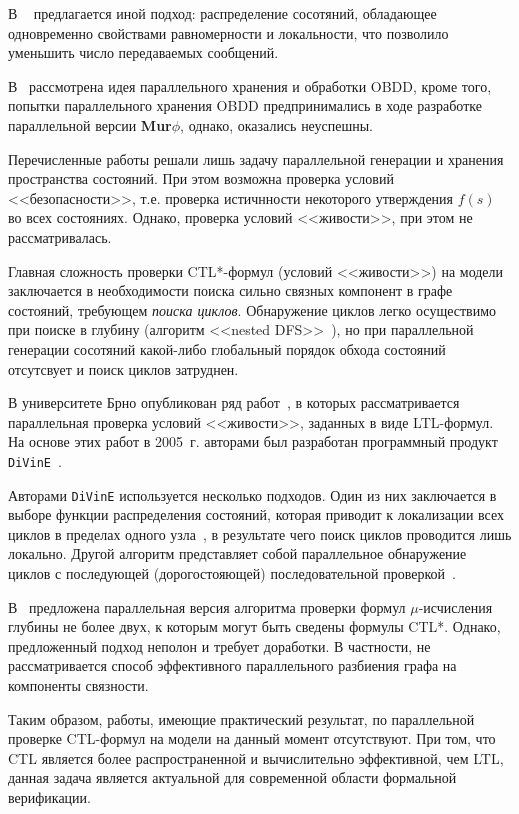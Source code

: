 \documentclass[a4paper,notitlepage,14pt]{article}
\begin{document}
В ~\cite{LS99} предлагается иной подход: распределение сосотяний, обладающее одновременно
свойствами равномерности и локальности, что позволило уменьшить число передаваемых
сообщений.

В~\cite{McMillan92} рассмотрена идея параллельного хранения и обработки OBDD, кроме того,
попытки параллельного хранения OBDD предпринимались в ходе разработке параллельной версии
\textbf{Mur$\phi$}, однако, оказались неуспешны.

Перечисленные работы решали лишь задачу параллельной генерации и хранения пространства
состояний. При этом возможна проверка условий <<безопасности>>, т.е. проверка истичнности
некоторого утверждения $f(s)$ во всех состояниях. Однако, проверка условий <<живости>>,
при этом не рассматривалась.

Главная сложность проверки CTL*-формул (условий <<живости>>) на модели заключается в
необходимости поиска сильно связных компонент в графе состояний, требующем \emph{поиска
  циклов}. Обнаружение циклов легко осуществимо при поиске в глубину (алгоритм <<nested
DFS>>~\cite{DBLP:conf/spin/FaragoS09}), но при параллельной генерации сосотяний какой-либо
глобальный порядок обхода состояний отсутсвует и поиск циклов затруднен.

В университете Брно опубликован ряд работ~\cite{DLTL1,DLTL2}, в которых рассматривается
параллельная проверка условий <<живости>>, заданных в виде LTL-формул. На основе этих
работ в 2005~г. авторами был разработан программный продукт \texttt{DiVinE}~\cite{DiVinE}.

Авторами \texttt{DiVinE} используется несколько подходов. Один из них заключается в выборе
функции распределения состояний, которая приводит к локализации всех циклов в пределах
одного узла~\cite{DLTL1}, в результате чего поиск циклов проводится лишь локально. Другой
алгоритм представляет собой параллельное обнаружение циклов с последующей (дорогостояющей)
последовательной проверкой~\cite{DLTL2}.

В~\cite{Leucker_parallelmodel} предложена параллельная версия алгоритма проверки формул
$\mu$-исчисления глубины не более двух, к которым могут быть сведены формулы CTL*. Однако,
предложенный подход неполон и требует доработки. В частности, не рассматривается способ
эффективного параллельного разбиения графа на компоненты связности.

Таким образом, работы, имеющие практический результат, по параллельной проверке CTL-формул
на модели на данный момент отсутствуют. При том, что CTL является более распространенной и
вычислительно эффективной, чем LTL, данная задача является актуальной для современной
области формальной верификации.
\end{document}
